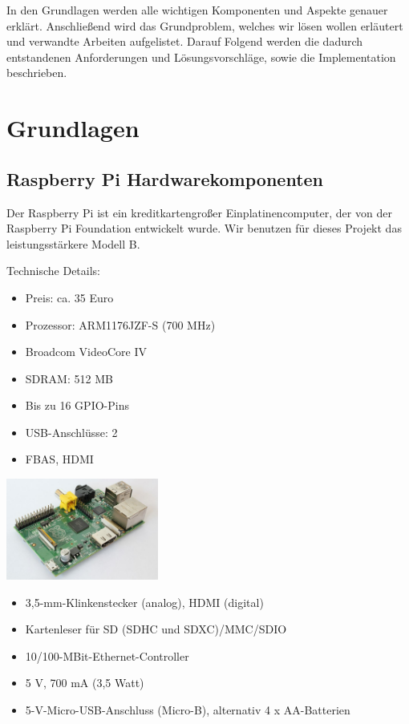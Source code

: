 \documentclass[12pt]{article}
\begin{document}
In den Grundlagen werden alle wichtigen Komponenten und Aspekte genauer erklärt. Anschließend wird das Grundproblem, welches wir lösen wollen erläutert und verwandte Arbeiten aufgelistet. 
Darauf Folgend werden die dadurch entstandenen Anforderungen und Lösungsvorschläge, sowie die Implementation beschrieben.

\section{Grundlagen}

\subsection{Raspberry Pi Hardwarekomponenten}

Der Raspberry Pi ist ein kreditkartengroßer Einplatinencomputer, der von der Raspberry Pi Foundation entwickelt wurde.
Wir benutzen für dieses Projekt das leistungsstärkere Modell B.
\parbox{8cm}{
Technische Details:
\begin{itemize}
\item Preis: ca. 35 Euro
\item Prozessor: ARM1176JZF-S (700 MHz)
\item Broadcom VideoCore IV
\item SDRAM: 512 MB
\item Bis zu 16 GPIO-Pins
\item USB-Anschlüsse: 2
\item FBAS, HDMI
\end{itemize}
}
\hfill
\parbox{5cm}{
\includegraphics[width=5cm]{Raspi.jpg}
}
\begin{itemize}
\item 3,5-mm-Klinkenstecker (analog), HDMI (digital)
\item Kartenleser für SD (SDHC und SDXC)/MMC/SDIO
\item 10/100-MBit-Ethernet-Controller 
\item 5 V, 700 mA (3,5 Watt)
\item 5-V-Micro-USB-Anschluss (Micro-B), alternativ 4 x AA-Batterien
\end{itemize}
\end{document}
